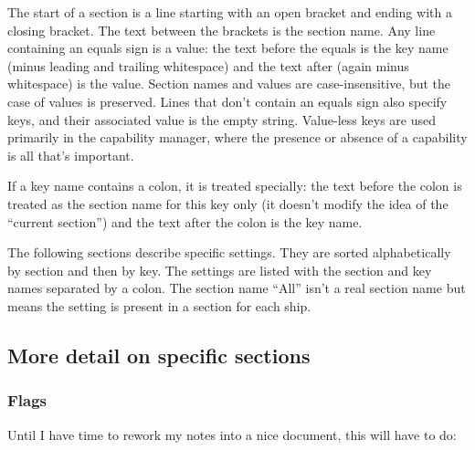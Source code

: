 \documentclass{article}
\begin{document}
The start of a section is a line starting with an open bracket and
ending with a closing bracket. The text between the brackets is the
section name. Any line containing an equals sign is a value: the text
before the equals is the key name (minus leading and trailing
whitespace) and the text after (again minus whitespace) is the value.
Section names and values are case-insensitive, but the case of values is
preserved. Lines that don't contain an equals sign also specify keys,
and their associated value is the empty string. Value-less keys are used
primarily in the capability manager, where the presence or absence of a
capability is all that's important.

If a key name contains a colon, it is treated specially: the text before
the colon is treated as the section name for this key only (it doesn't
modify the idea of the ``current section'') and the text after the colon
is the key name.

The following sections describe specific settings. They are sorted
alphabetically by section and then by key. The settings are listed with
the section and key names separated by a colon. The section name ``All''
isn't a real section name but means the setting is present in a section
for each ship.



\subsection{More detail on specific sections}

\subsubsection{Flags}

Until I have time to rework my notes into a nice document, this will
have to do:
\end{document}
